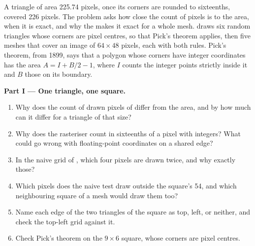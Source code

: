 \begin{problem}\label{pb:b3:computer-graphics:1}
A triangle of area 225.74 pixels, once its corners are rounded to sixteenths, covered 226 pixels. The problem asks how close the count of pixels is to the area, when it is exact, and why the  makes it exact for a whole mesh.  draws six random triangles whose corners are pixel centres, so that Pick's theorem applies, then five meshes that cover an image of $64 \times 48$ pixels, each with both rules. Pick's theorem, from 1899, says that a polygon whose corners have integer coordinates has the area $A = I + B/2 - 1$, where $I$ counts the integer points strictly inside it and $B$ those on its boundary. %

\label{out:b3:computer-graphics:mesh}

\medskip\noindent\textbf{Part I --- One triangle, one square.}
\begin{enumerate}
  \item Why does the count of drawn pixels of  differ from the area, and by how much can it differ for a triangle of that size?
  \item Why does the rasteriser count in sixteenths of a pixel with integers? What could go wrong with floating-point coordinates on a shared edge?
  \item In the naive grid of , which four pixels are drawn twice, and why exactly those?
  \item Which pixels does the naive test draw outside the square's 54, and which neighbouring square of a mesh would draw them too?
  \item Name each edge of the two triangles of the square as top, left, or neither, and check the top-left grid against it.
  \item Check Pick's theorem on the $9 \times 6$ square, whose corners are pixel centres.
\end{enumerate}


\end{problem}
